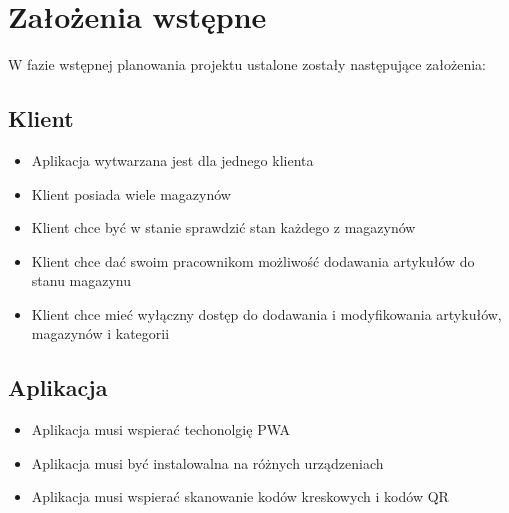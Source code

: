 \documentclass[../main.tex]{subfiles}
\begin{document}
\section{Założenia wstępne}

    W fazie wstępnej planowania projektu ustalone zostały następujące założenia:
    \subsection*{Klient}
        \begin{itemize}
            \item Aplikacja wytwarzana jest dla jednego klienta
            \item Klient posiada wiele magazynów
            \item Klient chce być w stanie sprawdzić stan każdego z magazynów
            \item Klient chce dać swoim pracownikom możliwość dodawania artykułów do stanu magazynu
            \item Klient chce mieć wyłączny dostęp do dodawania i modyfikowania artykułów, magazynów i kategorii
        \end{itemize} 
    \subsection*{Aplikacja}
        \begin{itemize}
            \item Aplikacja musi wspierać techonolgię PWA
            \item Aplikacja musi być instalowalna na różnych urządzeniach
            \item Aplikacja musi wspierać skanowanie kodów kreskowych i kodów QR
        \end{itemize}
\end{document}
